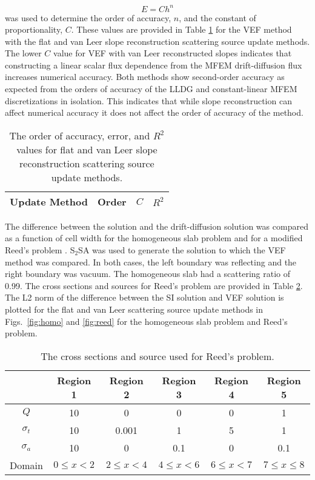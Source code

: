 \begin{equation}
		E = C h^n
	\end{equation}
was used to determine the order of accuracy, $n$, and the constant of proportionality, $C$. These values are provided in Table \ref{tab:mms} for the VEF method with the flat and van Leer slope reconstruction scattering source update methods. 
 The lower $C$ value for VEF with van Leer reconstructed slopes indicates that constructing a linear scalar flux dependence from the MFEM drift-diffusion flux increases numerical accuracy. Both methods show second-order accuracy as expected from the orders of accuracy of the LLDG and constant-linear MFEM discretizations in isolation. This indicates that while slope reconstruction can affect numerical 
 accuracy it does not affect the order of accuracy of the method. 
	\begin{table}[htb]
	\centering
	{\color{red}
	\begin{tabular}{|c|c|c|c|}
	\hline
	\hline
	Update Method & Order & $C$ & $R^2$ \\ 
	\hline
		
	\hline
	\hline
	\end{tabular}
	\caption{The order of accuracy, error, and $R^2$ values for flat and van Leer slope reconstruction scattering source update methods. }
	\label{tab:mms}
	}%
	\end{table}
The difference between the \SN solution and the drift-diffusion solution was compared as a function of cell width for the homogeneous slab problem and for a 
{\color{red}modified Reed's problem \cite{reed}}. S$_2$SA was used to generate the \SN solution to which the VEF method was compared. In both cases, the left boundary was reflecting and the right boundary was vacuum. The homogeneous slab had a scattering ratio of 0.99. The cross sections and sources for Reed's problem are provided in Table \ref{tab:reedXS}. The L2 norm of the difference between the SI solution and VEF solution is plotted for the flat and van Leer scattering source update methods in Figs.~\ref{fig:homo} and \ref{fig:reed} for the homogeneous slab problem and Reed's problem. 

	\begin{table}[htb]
	 \centering
		\begin{tabular}{|c|c|c|c|c|c|}
			\hline
			& Region 1 & Region 2 & Region 3 & Region 4 & Region 5 \\ 
			\hline 
			$Q$ & 10 & 0 & 0 & 0 & 1 \\ 
			$\sigma_t$ & 10 & 0.001 & 1 & 5 & 1 \\ 
			$\sigma_a$ & 10 & 0 & 0.1 & 0 & 0.1 \\ 
			\hline 
			Domain & $0 \leq x < 2$ & $2 \leq x < 4$ & $4\leq x < 6$ &
				$6 \leq x < 7$ & $7 \leq x \leq 8$\\ 
			\hline 
		\end{tabular}
		\caption{The cross sections and source used for Reed's problem.}
		\label{tab:reedXS}
	\end{table}

